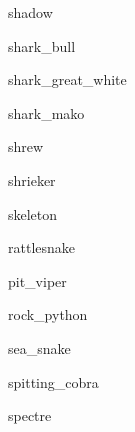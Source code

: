 \documentclass[letterpaper,serif]{module}
\begin{document}
\begin{newmonster}{shadow}\end{newmonster}

\begin{newmonster}{shark_bull}\end{newmonster}

\begin{newmonster}{shark_great_white}\end{newmonster}

\begin{newmonster}{shark_mako}\end{newmonster}

\begin{newmonster}{shrew}\end{newmonster}

\begin{newmonster}{shrieker}\end{newmonster}

\begin{newmonster}{skeleton}\end{newmonster}

\begin{newmonster}{rattlesnake}\end{newmonster}

\begin{newmonster}{pit_viper}\end{newmonster}

\begin{newmonster}{rock_python}\end{newmonster}

\begin{newmonster}{sea_snake}\end{newmonster}

\begin{newmonster}{spitting_cobra}\end{newmonster}

\begin{newmonster}{spectre}\end{newmonster}
\end{document}
